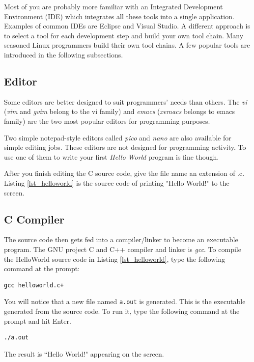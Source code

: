 Most of you are probably more familiar with an Integrated Development Environment (IDE) which integrates all these tools into a single application. Examples of common IDEs are Eclipse and Visual Studio. A different approach is to select a tool for each development step and build your own tool chain. Many seasoned Linux programmers build their own tool chains. A few popular tools are introduced in the following subsections.

\subsection{Editor}

Some editors are better designed to suit programmers' needs than others. The {\em vi} ({\em vim} and {\em gvim} belong to the vi family) and {\em emacs} ({\em xemacs} belongs to emacs family) are the two most popular editors for programming purposes.


Two simple notepad-style editors called {\em pico} and {\em nano} are also available for simple editing jobs. These editors are not designed for programming activity. To use one of them to write your first {\em Hello World} program is fine though. 

After you finish editing the C source code, give the file name an extension of .c. Listing \ref{lst_helloworld} is the source code of printing "Hello World!" to the screen. 



\subsection{C Compiler}
The source code then gets fed into a compiler/linker to become an executable program.
The GNU project C and C++ compiler and linker is {\em gcc}. To compile the HelloWorld source code in Listing \ref{lst_helloworld}, type the following command at the prompt:
\begin{lstlisting}[style=bash]
gcc helloworld.c+ 
\end{lstlisting}
You will notice that a new file named \verb+a.out+ is generated.
This is the executable generated from the source code. To run it, type the following command at the prompt and hit Enter.
\begin{lstlisting}[style=bash]
./a.out
\end{lstlisting}
The result is ``Hello World!" appearing on the screen.


